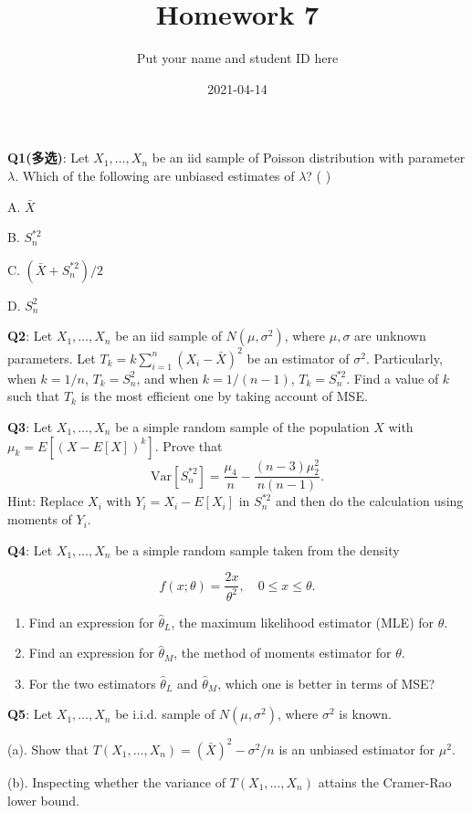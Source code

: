\documentclass[]{article}
\title{Homework 7}
\author{Put your name and student ID here}
\date{2021-04-14}
\begin{document}
\maketitle

\textbf{Q1(多选)}: Let \(X_1,\dots,X_n\) be an iid sample of Poisson
distribution with parameter \(\lambda\). Which of the following are
unbiased estimates of \(\lambda\)? ( )

A. \(\bar X\)

B. \(S_n^{*2}\)

C. \((\bar X+S_n^{*2})/2\)

D. \(S_n^2\)

\textbf{Q2}: Let \(X_1,\dots,X_n\) be an iid sample of
\(N(\mu,\sigma^2)\), where \(\mu,\sigma\) are unknown parameters. Let
\(T_k=k\sum_{i=1}^n(X_i-\bar X)^2\) be an estimator of \(\sigma^2\).
Particularly, when \(k=1/n\), \(T_k=S_n^2\), and when \(k=1/(n-1)\),
\(T_k=S_n^{*2}\). Find a value of \(k\) such that \(T_k\) is the most
efficient one by taking account of MSE.

\textbf{Q3}: Let \(X_1,\dots,X_n\) be a simple random sample of the
population \(X\) with \(\mu_k = E[(X-E[X])^k]\). Prove that
\[\mathrm{Var}[S_n^{*2}]= \frac{\mu_4}{n}-\frac{(n-3)\mu_2^2}{n(n-1)}.\]
Hint: Replace \(X_i\) with \(Y_i=X_i-E[X_i]\) in \(S_n^{*2}\) and then
do the calculation using moments of \(Y_i\).

\textbf{Q4}: Let \(X_1,\dots,X_n\) be a simple random sample taken from
the density

\[f(x;\theta)=\frac{2x}{\theta^2},\quad 0\le x\le \theta.\]

\begin{enumerate}
\def\labelenumi{\arabic{enumi}.}
\item
  Find an expression for \(\hat\theta_L\), the maximum likelihood
  estimator (MLE) for \(\theta\).
\item
  Find an expression for \(\hat\theta_M\), the method of moments
  estimator for \(\theta\).
\item
  For the two estimators \(\hat\theta_L\) and \(\hat\theta_M\), which
  one is better in terms of MSE?
\end{enumerate}

\textbf{Q5}: Let \(X_1,\dots,X_n\) be i.i.d. sample of
\(N(\mu,\sigma^2)\), where \(\sigma^2\) is known.

(a). Show that \(T(X_1,\dots,X_n) = (\bar X)^2-\sigma^2/n\) is an
unbiased estimator for \(\mu^2\).

(b). Inspecting whether the variance of \(T(X_1,\dots,X_n)\) attains the
Cramer-Rao lower bound.
\end{document}
